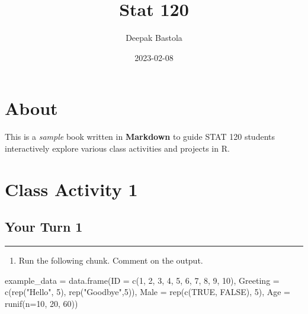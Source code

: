 \documentclass[
]{book}
\title{Stat 120}
\author{Deepak Bastola}
\date{2023-02-08}
\newenvironment{Shaded}{\begin{snugshade}}{\end{snugshade}}
\newcommand{\AttributeTok}[1]{\textcolor[rgb]{0.77,0.63,0.00}{#1}}
\newcommand{\ConstantTok}[1]{\textcolor[rgb]{0.00,0.00,0.00}{#1}}
\newcommand{\DecValTok}[1]{\textcolor[rgb]{0.00,0.00,0.81}{#1}}
\newcommand{\FunctionTok}[1]{\textcolor[rgb]{0.00,0.00,0.00}{#1}}
\newcommand{\NormalTok}[1]{#1}
\newcommand{\OtherTok}[1]{\textcolor[rgb]{0.56,0.35,0.01}{#1}}
\newcommand{\StringTok}[1]{\textcolor[rgb]{0.31,0.60,0.02}{#1}}
\providecommand{\tightlist}{%
  \setlength{\itemsep}{0pt}\setlength{\parskip}{0pt}}
\begin{document}
\maketitle

{
\setcounter{tocdepth}{1}
\tableofcontents
}
\hypertarget{about}{%
\chapter*{About}\label{about}}

This is a \emph{sample} book written in \textbf{Markdown} to guide STAT 120 students interactively explore various class activities and projects in R.

\hypertarget{class-activity-1}{%
\chapter{Class Activity 1}\label{class-activity-1}}

\hypertarget{your-turn-1}{%
\section{Your Turn 1}\label{your-turn-1}}

\begin{center}\rule{0.5\linewidth}{0.5pt}\end{center}

\begin{enumerate}
\def\labelenumi{\alph{enumi}.}
\tightlist
\item
  Run the following chunk. Comment on the output.
\end{enumerate}

\begin{Shaded}
\begin{Highlighting}[]
\NormalTok{example\_data }\OtherTok{=} \FunctionTok{data.frame}\NormalTok{(}\AttributeTok{ID =} \FunctionTok{c}\NormalTok{(}\DecValTok{1}\NormalTok{, }\DecValTok{2}\NormalTok{, }\DecValTok{3}\NormalTok{, }\DecValTok{4}\NormalTok{, }\DecValTok{5}\NormalTok{, }\DecValTok{6}\NormalTok{, }\DecValTok{7}\NormalTok{, }\DecValTok{8}\NormalTok{, }\DecValTok{9}\NormalTok{, }\DecValTok{10}\NormalTok{),}
                          \AttributeTok{Greeting =} \FunctionTok{c}\NormalTok{(}\FunctionTok{rep}\NormalTok{(}\StringTok{"Hello"}\NormalTok{, }\DecValTok{5}\NormalTok{), }\FunctionTok{rep}\NormalTok{(}\StringTok{"Goodbye"}\NormalTok{,}\DecValTok{5}\NormalTok{)),}
                          \AttributeTok{Male =} \FunctionTok{rep}\NormalTok{(}\FunctionTok{c}\NormalTok{(}\ConstantTok{TRUE}\NormalTok{, }\ConstantTok{FALSE}\NormalTok{), }\DecValTok{5}\NormalTok{),}
                          \AttributeTok{Age =} \FunctionTok{runif}\NormalTok{(}\AttributeTok{n=}\DecValTok{10}\NormalTok{, }\DecValTok{20}\NormalTok{, }\DecValTok{60}\NormalTok{))}
\end{Highlighting}
\end{Shaded}
\end{document}
